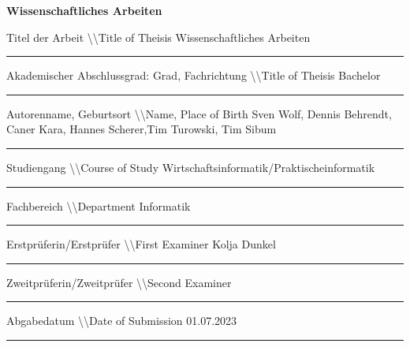 


\begin{titlepage}


\hfill
\begin{spacing}{1}
\begin{spacing}{0.5}
\fontsize{44pt}{50pt}\selectfont\textbf{Wissenschaftliches Arbeiten}
\newline
\end{spacing}

\scriptsize{Titel der Arbeit \textbackslash\textbackslash Title of Theisis}
\newline
\large{Wissenschaftliches Arbeiten}
\newline
\hrule

\scriptsize{Akademischer Abschlussgrad: Grad, Fachrichtung \textbackslash\textbackslash Title of Theisis}
\newline
\large{Bachelor}
\newline
\hrule

\scriptsize{Autorenname, Geburtsort \textbackslash\textbackslash Name, Place of Birth}
\newline
\large{Sven Wolf, Dennis Behrendt, Caner Kara, Hannes Scherer,\newline Tim Turowski, Tim Sibum}
\newline
\hrule

\scriptsize{Studiengang \textbackslash\textbackslash Course of Study}
\newline
\large{Wirtschaftsinformatik/Praktischeinformatik}
\newline
\hrule

\scriptsize{Fachbereich \textbackslash\textbackslash Department}
\newline
\large{Informatik}
\newline
\hrule

\scriptsize{Erstprüferin/Erstprüfer \textbackslash\textbackslash First Examiner}
\newline
\large{Kolja Dunkel}
\newline
\hrule

\scriptsize{Zweitprüferin/Zweitprüfer \textbackslash\textbackslash Second Examiner}
\newline
\large{ }
\newline
\hrule

\scriptsize{Abgabedatum \textbackslash\textbackslash Date of Submission}
\newline
\large{01.07.2023}
\newline
\hrule

\end{spacing}
\end{titlepage}

